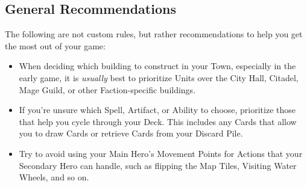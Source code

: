 \begin{multicols}{2}

\subsection*{General Recommendations}

The following are not custom rules, but rather recommendations to help you get the most out of your game:

\begin{itemize}
  \item When deciding which building to construct in your Town, especially in the early game, it is \textit{usually} best to prioritize Units over the City Hall, Citadel, Mage Guild, or other Faction-specific buildings.
  \item If you're unsure which Spell, Artifact, or Ability to choose, prioritize those that help you cycle through your Deck.
    This includes any Cards that allow you to draw Cards or retrieve Cards from your Discard Pile.
  \item Try to avoid using your Main Hero's Movement Points for Actions that your Secondary Hero can handle, such as flipping the Map Tiles, Visiting Water Wheels, and so on.
\end{itemize}

\begin{center}
\end{center}

\end{multicols}
